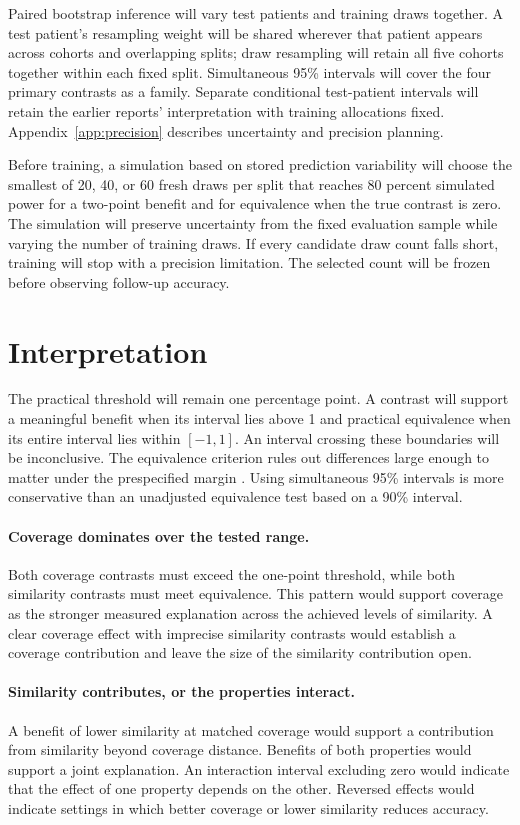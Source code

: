 \documentclass[11pt]{article}
\begin{document}
Paired bootstrap inference will vary test patients and training draws together. A test patient's resampling weight will be shared wherever that patient appears across cohorts and overlapping splits; draw resampling will retain all five cohorts together within each fixed split. Simultaneous 95\% intervals will cover the four primary contrasts as a family. Separate conditional test-patient intervals will retain the earlier reports' interpretation with training allocations fixed. Appendix~\ref{app:precision} describes uncertainty and precision planning.

Before training, a simulation based on stored prediction variability will choose the smallest of 20, 40, or 60 fresh draws per split that reaches 80 percent simulated power for a two-point benefit and for equivalence when the true contrast is zero. The simulation will preserve uncertainty from the fixed evaluation sample while varying the number of training draws. If every candidate draw count falls short, training will stop with a precision limitation. The selected count will be frozen before observing follow-up accuracy.

\section{Interpretation}
\label{sec:interpretation}
The practical threshold will remain one percentage point. A contrast will support a meaningful benefit when its interval lies above 1 and practical equivalence when its entire interval lies within $[-1,1]$. An interval crossing these boundaries will be inconclusive. The equivalence criterion rules out differences large enough to matter under the prespecified margin \citep{lakens2017equivalence}. Using simultaneous 95\% intervals is more conservative than an unadjusted equivalence test based on a 90\% interval.

\paragraph{Coverage dominates over the tested range.}
Both coverage contrasts must exceed the one-point threshold, while both similarity contrasts must meet equivalence. This pattern would support coverage as the stronger measured explanation across the achieved levels of similarity. A clear coverage effect with imprecise similarity contrasts would establish a coverage contribution and leave the size of the similarity contribution open.

\paragraph{Similarity contributes, or the properties interact.}
A benefit of lower similarity at matched coverage would support a contribution from similarity beyond coverage distance. Benefits of both properties would support a joint explanation. An interaction interval excluding zero would indicate that the effect of one property depends on the other. Reversed effects would indicate settings in which better coverage or lower similarity reduces accuracy.
\end{document}
